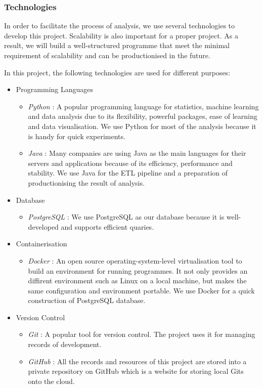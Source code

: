 \documentclass[11pt]{article} %
\theoremstyle{plain}
\theoremstyle{definition}
\begin{document}
\subsubsection{Technologies}

In order to facilitate the process of analysis, we use several technologies to develop this project. Scalability is also important for a proper project. As a result, we will build a well-structured programme that meet the minimal requirement of scalability and can be productionised in the future.

In this project, the following technologies are used for different purposes:
\begin{itemize}
  \item Programming Languages
  \begin{itemize}
    \item \textsl{Python} : A popular programming language for statistics, machine learning and data analysis due to its flexibility, powerful packages, ease of learning and data visualisation. We use Python for most of the analysis because it is handy for quick experiments.
    \item \textsl{Java} : Many companies are using Java as the main languages for their servers and applications because of its efficiency, performance and stability. We use Java for the ETL pipeline and a preparation of productionising the result of analysis.
  \end{itemize}

  \item Database
  \begin{itemize}
    \item \textsl{PostgreSQL} : We use PostgreSQL as our database because it is well-developed and supports efficient quaries.
  \end{itemize}

  \item Containerisation
  \begin{itemize}
    \item \textsl{Docker} : An open source operating-system-level virtualisation tool to build an environment for running programmes. It not only provides an diffirent environment such as Linux on a local machine, but makes the same configuration and environment portable. We use Docker for a quick construction of PostgreSQL database.
  \end{itemize}

  \item Version Control
  \begin{itemize}
    \item \textsl{Git} : A popular tool for version control. The project uses it for managing records of development.
    \item \textsl{GitHub} : All the records and resources of this project are stored into a private repository on GitHub which is a website for storing local Gits onto the cloud.
  \end{itemize}


\end{itemize}
\end{document}

